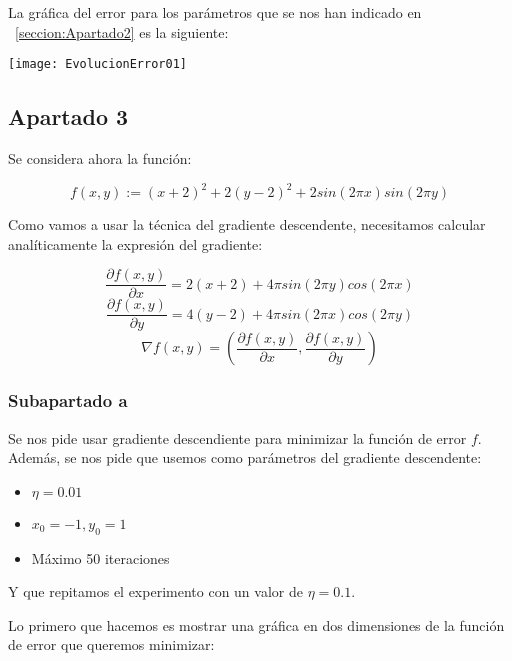 \documentclass[11pt]{article}
\begin{document}
La gráfica del error para los parámetros que se nos han indicado en ~\ref{seccion:Apartado2} es la siguiente:

\texttt{[image: EvolucionError01]}

\subsection{Apartado 3}

Se considera ahora la función:

\begin{displaymath}
    f(x,y) := (x+2)^2 + 2(y-2)^2 + 2 sin(2\pi x) sin(2 \pi y)
\end{displaymath}

Como vamos a usar la técnica del gradiente descendente, necesitamos calcular analíticamente la expresión del gradiente:

\begin{displaymath}
    \frac{\partial f(x,y)}{\partial x} = 2(x+2) + 4 \pi sin(2 \pi y) cos(2 \pi x)
\end{displaymath}
\begin{displaymath}
    \frac{\partial f(x,y)}{\partial y} = 4(y - 2) + 4 \pi sin(2 \pi x) cos(2 \pi y)
\end{displaymath}
\begin{displaymath}
    \nabla f(x, y) = (\frac{\partial f(x,y)}{\partial x}, \frac{\partial f(x,y)}{\partial y})
\end{displaymath}

\subsubsection{Subapartado a}

Se nos pide usar gradiente descendiente para minimizar la función de error $f$. Además, se nos pide que usemos como parámetros del gradiente descendente:

\begin{itemize}
    \item $\eta = 0.01$
    \item $x_0 = -1, y_0 = 1$
    \item Máximo 50 iteraciones
\end{itemize}

Y que repitamos el experimento con un valor de $\eta = 0.1$.

Lo primero que hacemos es mostrar una gráfica en dos dimensiones de la función de error que queremos minimizar:
\end{document}
